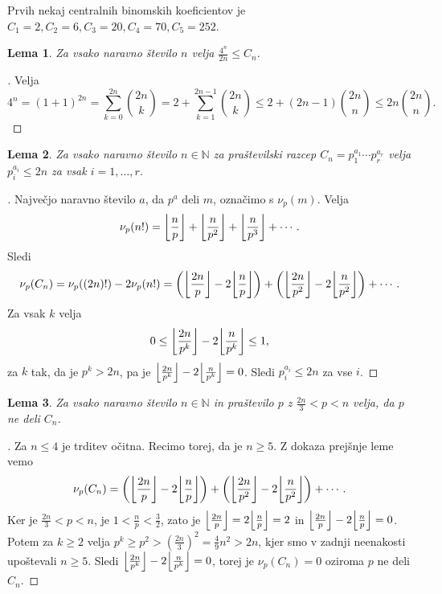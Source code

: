 \documentclass[a4paper,12pt]{article}
\def\N{\mathbb{N}}
\theoremstyle{definition}
\theoremstyle{plain}
\newtheorem{lema}{Lema}
\newenvironment{dokaz}{\begin{proof}[\bfseries\upshape\proofname]}{\end{proof}}
\DeclarePairedDelimiter\floor{\lfloor}{\rfloor}
\begin{document}
Prvih nekaj centralnih binomskih koeficientov je $C_1 = 2, C_2 = 6, C_3 = 20, C_4 = 70, C_5 = 252$.

\begin{lema}
    \label{lema1}
    Za vsako naravno število $n$ velja $\frac{4^n}{2n} \leq C_n$.
\end{lema}
\begin{dokaz} %
    Velja $$4^n = (1+1)^{2n} = \sum_{k = 0}^{2n} \binom{2n}{k} = 2 + \sum_{k = 1}^{2n - 1} \binom{2n}{k} \leq 2 + (2n - 1)\binom{2n}{n} \leq 2n\binom{2n}{n}.$$
\end{dokaz}

\begin{lema}
    \label{lema2}
    Za vsako naravno število $n \in \N$ za praštevilski razcep $C_n = p_1^{a_1} \cdots p_r^{a_r}$ velja $p_i^{a_i} \leq 2n$ za vsak $i = 1,\ldots,r$. 
\end{lema}
\begin{dokaz}
    Največjo naravno število $a$, da $p^a$ deli $m$, označimo s $\nu_p(m)$. Velja $$\nu_p(n!) = \floor*{\frac{n}{p}} + \floor*{\frac{n}{p^2}} + \floor*{\frac{n}{p^3}} + \cdots.$$ Sledi $$\nu_p(C_n) = \nu_p((2n)!) - 2\nu_p(n!) = \left( \floor*{\frac{2n}{p}} - 2\floor*{\frac{n}{p}} \right) + \left( \floor*{\frac{2n}{p^2}} - 2\floor*{\frac{n}{p^2}} \right) + \cdots.$$ Za vsak $k$ velja $$0 \leq \floor*{\frac{2n}{p^k}} - 2\floor*{\frac{n}{p^k}} \leq 1,$$ za $k$ tak, da je $p^k > 2n$, pa je $\floor*{\frac{2n}{p^k}} - 2\floor*{\frac{n}{p^k}} = 0$. Sledi $p_i^{a_i} \leq 2n$ za vse $i$.
\end{dokaz}

\begin{lema}
    \label{lema3}
    Za vsako naravno število $n \in \N$ in praštevilo $p$ z $\frac{2n}{3} < p < n$ velja, da $p$ ne deli $C_n$. 
\end{lema}
\begin{dokaz}
    Za $n \leq 4$ je trditev očitna. Recimo torej, da je $n \geq 5$. Z dokaza prejšnje leme vemo $$\nu_p(C_n) = \left( \floor*{\frac{2n}{p}} - 2\floor*{\frac{n}{p}} \right) + \left( \floor*{\frac{2n}{p^2}} - 2\floor*{\frac{n}{p^2}} \right) + \cdots.$$ Ker je $\frac{2n}{3} < p < n$, je $1 < \frac{n}{p} < \frac{3}{2}$, zato je $\floor*{\frac{2n}{p}} = 2\floor*{\frac{n}{p}} = 2$ in $\floor*{\frac{2n}{p}} - 2\floor*{\frac{n}{p}} = 0$. Potem za $k \geq 2$ velja $p^k \geq p^2 > (\frac{2n}{3})^2 = \frac{4}{9}n^2 > 2n$, kjer smo v zadnji neenakosti upoštevali $n \geq 5$. Sledi $\floor*{\frac{2n}{p^k}} - 2\floor*{\frac{n}{p^k}} = 0$, torej je $\nu_p(C_n) = 0$ oziroma $p$ ne deli $C_n$.
\end{dokaz}
\end{document}
